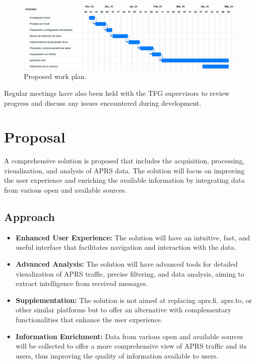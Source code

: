 \begin{figure}[h]
	\centering
	\includegraphics[width=1\textwidth]{Imagenes/Chapter_1/gant.png}
	\caption{Proposed work plan.}
	\label{fig:gantt-diagram}
\end{figure}

Regular meetings have also been held with the TFG supervisors to review progress and discuss any issues encountered during development.

\section{Proposal}
A comprehensive solution is proposed that includes the acquisition, processing, visualization, and analysis of APRS data. The solution will focus on improving the user experience and enriching the available information by integrating data from various open and available sources.

\subsection{Approach}

\begin{itemize}
	\item \textbf{Enhanced User Experience:} The solution will have an intuitive, fast, and useful interface that facilitates navigation and interaction with the data.
	\item \textbf{Advanced Analysis:} The solution will have advanced tools for detailed visualization of APRS traffic, precise filtering, and data analysis, aiming to extract intelligence from received messages.

	\item \textbf{Supplementation:} The solution is not aimed at replacing aprs.fi, aprs.to, or other similar platforms but to offer an alternative with complementary functionalities that enhance the user experience.

	\item \textbf{Information Enrichment:} Data from various open and available sources will be collected to offer a more comprehensive view of APRS traffic and its users, thus improving the quality of information available to users.
\end{itemize}

